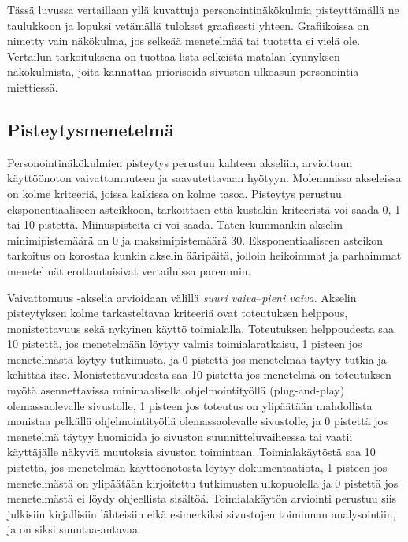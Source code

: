 \documentclass[finnish, 12pt, a4paper, elec, utf8, a-1b, online]{aaltothesis}
\begin{document}
Tässä luvussa vertaillaan yllä kuvattuja personointinäkökulmia pisteyttämällä ne
taulukkoon ja lopuksi vetämällä tulokset graafisesti yhteen. Grafiikoissa on
nimetty vain näkökulma, jos selkeää menetelmää tai tuotetta ei vielä ole.
Vertailun tarkoituksena on tuottaa lista selkeistä matalan kynnyksen
näkökulmista, joita kannattaa priorisoida sivuston ulkoasun personointia
miettiessä.

\subsection{Pisteytysmenetelmä}

Personointinäkökulmien pisteytys perustuu kahteen akseliin, arvioituun
käyttöönoton vaivattomuuteen ja saavutettavaan hyötyyn. Molemmissa akseleissa on
kolme kriteeriä, joissa kaikissa on kolme tasoa. Pisteytys perustuu
eksponentiaaliseen asteikkoon, tarkoittaen että kustakin kriteeristä voi saada
0, 1 tai 10 pistettä. Miinuspisteitä ei voi saada. Täten kummankin akselin
minimipistemäärä on 0 ja maksimipistemäärä 30. Eksponentiaaliseen asteikon
tarkoitus on korostaa kunkin akselin ääripäitä, jolloin heikoimmat ja parhaimmat
menetelmät erottautuisivat vertailuissa paremmin.

Vaivattomuus -akselia arvioidaan välillä \textit{suuri vaiva}--\textit{pieni
    vaiva}. Akselin pisteytyksen kolme tarkasteltavaa kriteeriä ovat toteutuksen
helppous, monistettavuus sekä nykyinen käyttö toimialalla. Toteutuksen
helppoudesta saa 10 pistettä, jos menetelmään löytyy valmis toimialaratkaisu, 1
pisteen jos menetelmästä löytyy tutkimusta, ja 0 pistettä jos menetelmää täytyy
tutkia ja kehittää itse. Monistettavuudesta saa 10 pistettä jos menetelmä on
toteutuksen myötä asennettavissa minimaalisella ohjelmointityöllä
(plug-and-play) olemassaolevalle sivustolle, 1 pisteen jos toteutus on
ylipäätään mahdollista monistaa pelkällä ohjelmointityöllä olemassaolevalle
sivustolle, ja 0 pistettä jos menetelmä täytyy huomioida jo sivuston
suunnitteluvaiheessa tai vaatii käyttäjälle näkyviä muutoksia sivuston
toimintaan. Toimialakäytöstä saa 10 pistettä, jos menetelmän käyttöönotosta
löytyy dokumentaatiota, 1 pisteen jos menetelmästä on ylipäätään kirjoitettu
tutkimusten ulkopuolella ja 0 pistettä jos menetelmästä ei löydy ohjeellista
sisältöä. Toimialakäytön arviointi perustuu siis julkisiin kirjallisiin
lähteisiin eikä esimerkiksi sivustojen toiminnan analysointiin, ja on siksi
suuntaa-antavaa.
\end{document}
